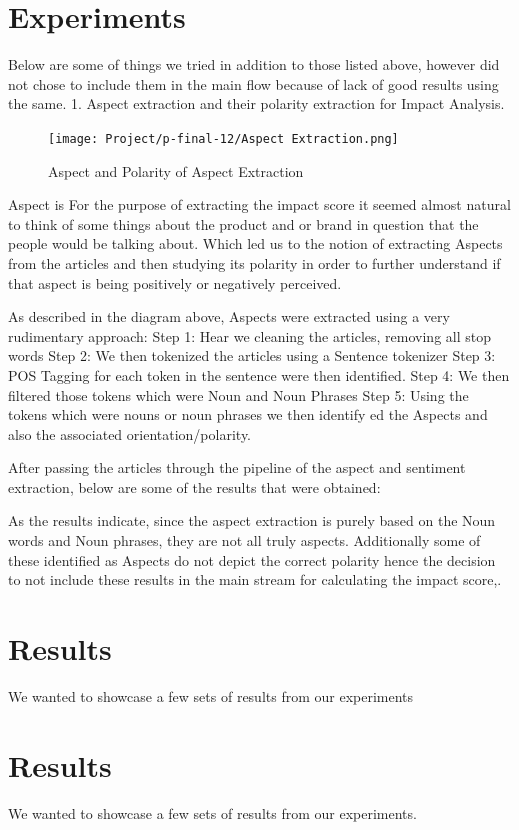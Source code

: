 \documentclass[paper=a4, fontsize=11pt]{scrartcl}
\numberwithin{equation}{section}		%
\numberwithin{figure}{section}			%
\numberwithin{table}{section}				%
\begin{document}
\section{Experiments}
Below are some of things we tried in addition to those listed above, however did not chose to include them in the main flow because of lack of good results using the same.
1. Aspect extraction and their polarity extraction for Impact Analysis. 
\begin{figure}
	\centering
 	 \texttt{[image: Project/p-final-12/Aspect Extraction.png]}
	  \caption{Aspect and Polarity of Aspect Extraction}
 	 \label{fig:Aspect Extraction.png}
\end{figure}
Aspect is 
For the purpose of extracting the impact score it seemed almost natural to think of some things about the product and or brand in question that the people would be talking about. Which led us to the notion of extracting Aspects from the articles and then studying its polarity in order to further understand if that aspect is being positively or negatively perceived.

As described in the diagram above, Aspects were extracted using a very rudimentary approach: 
Step 1: Hear we cleaning the articles, removing all stop words
Step 2: We then tokenized the articles using a Sentence tokenizer
Step 3: POS Tagging for each token in the sentence were then identified.  
Step 4: We then filtered those tokens which were Noun and Noun Phrases
Step 5: Using the tokens which were nouns or noun phrases we then identify ed the Aspects and also the associated orientation/polarity.

After passing the articles through the pipeline of the aspect and sentiment extraction, below are some of the results that were obtained: 


As the results indicate, since the aspect extraction is purely based on the Noun words and Noun phrases, they are not all truly aspects. 
Additionally some of these identified as Aspects do not depict the correct polarity hence the decision to not include these results in the main stream for calculating the impact score,. 
\section{Results}
We wanted to showcase a few sets of results from our experiments

\section{Results}
We wanted to showcase a few sets of results from our experiments.
\end{document}
